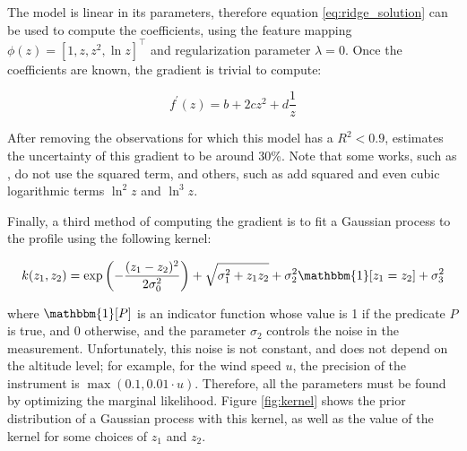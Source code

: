 \documentclass[a4paper]{book}
\begin{document}
The model is linear in its parameters, therefore equation \ref{eq:ridge_solution} can be used to compute the coefficients, using the feature mapping $\phi(z)=\left[1,z,z^2,\ln z\right]^\intercal$ and regularization parameter $\lambda=0$. Once the coefficients are known, the gradient is trivial to compute:

\begin{equation}
\label{eq:log_gradient}
f^\prime(z)=b+2cz^2+d\frac{1}{z}
\end{equation}

After removing the observations for which this model has a $R^2<0.9$, \cite{windlogprofile} estimates the uncertainty of this gradient to be around 30\%. Note that some works, such as \cite{windprof_nosqr}, do not use the squared term, and others, such as \cite{flux_vs_gradient_abl_depth} add squared and even cubic logarithmic terms $\ln^2z$ and $\ln^3z$.

Finally, a third method of computing the gradient is to fit a Gaussian process to the profile using the following kernel:

\begin{equation}
\label{eq:kernel}
k(z_1,z_2)=\exp\left(-\frac{(z_1-z_2)^2}{2\sigma_0^2}\right)+\sqrt{\sigma_1^2+ z_1 z_2}+\sigma_2^2 \mathbbm{1}[z_1=z_2]+\sigma_3^2
\end{equation}

\noindent where $\mathbbm{1}[P]$ is an indicator function whose value is 1 if the predicate $P$ is true, and 0 otherwise, and the parameter $\sigma_2$ controls the noise in the measurement. Unfortunately, this noise is not constant, and does not depend on the altitude level; for example, for the wind speed $u$, the precision of the instrument is $\max(0.1,0.01\cdot u)$. Therefore, all the parameters must be found by optimizing the marginal likelihood. Figure \ref{fig:kernel} shows the prior distribution of a Gaussian process with this kernel, as well as the value of the kernel for some choices of $z_1$ and $z_2$.
\end{document}

